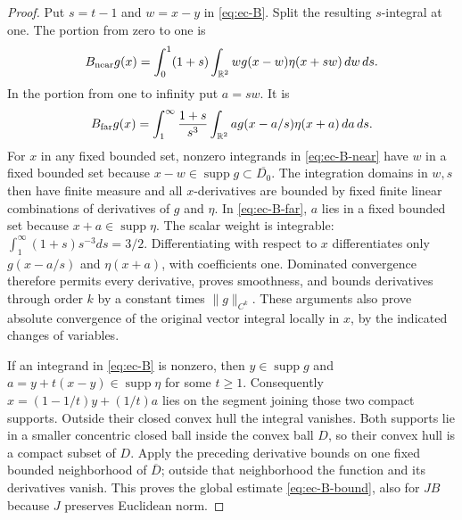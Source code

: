 \begin{proof}
Put \(s=t-1\) and \(w=x-y\) in \eqref{eq:ec-B}.  Split the resulting
\(s\)-integral at one.  The portion from zero to one is
\begin{equation}
 B_{\rm near}g(x)=\int_0^1(1+s)
              \int_{\mathbb R^2}w g(x-w)\eta(x+sw)\,dw\,ds.
 \label{eq:ec-B-near}
\end{equation}
In the portion from one to infinity put \(a=sw\).  It is
\begin{equation}
 B_{\rm far}g(x)=\int_1^\infty\frac{1+s}{s^3}
              \int_{\mathbb R^2}a g(x-a/s)\eta(x+a)\,da\,ds.
 \label{eq:ec-B-far}
\end{equation}
For \(x\) in any fixed bounded set, nonzero integrands in
\eqref{eq:ec-B-near} have \(w\) in a fixed bounded set because
\(x-w\in\operatorname{supp}g\subset\overline{D_0}\).
The integration domains in \(w,s\) then have finite measure and all
\(x\)-derivatives are bounded by fixed finite linear combinations of
derivatives of \(g\) and \(\eta\).  In \eqref{eq:ec-B-far},
\(a\) lies in a fixed bounded set because
\(x+a\in\operatorname{supp}\eta\).  The scalar weight is integrable:
\(\int_1^\infty(1+s)s^{-3}ds=3/2\).  Differentiating with respect to
\(x\) differentiates only \(g(x-a/s)\) and \(\eta(x+a)\), with
coefficients one.  Dominated convergence therefore permits every
derivative, proves smoothness, and bounds derivatives through order
\(k\) by a constant times \(\|g\|_{C^k}\).  These arguments also
prove absolute convergence of the original vector integral locally in
\(x\), by the indicated changes of variables.

If an integrand in \eqref{eq:ec-B} is nonzero, then
\(y\in\operatorname{supp}g\) and
\(a=y+t(x-y)\in\operatorname{supp}\eta\) for some \(t\geq1\).
Consequently \(x=(1-1/t)y+(1/t)a\) lies on the segment joining those
two compact supports.  Outside their closed convex hull the integral
vanishes.  Both supports lie in a smaller concentric closed ball inside
the convex ball \(D\), so their convex hull is a compact subset of
\(D\).  Apply the preceding derivative bounds on one fixed bounded
neighborhood of \(\overline D\); outside that neighborhood the function
and its derivatives vanish.  This proves the global estimate
\eqref{eq:ec-B-bound}, also for \(JB\) because \(J\) preserves
Euclidean norm.


\end{proof}
